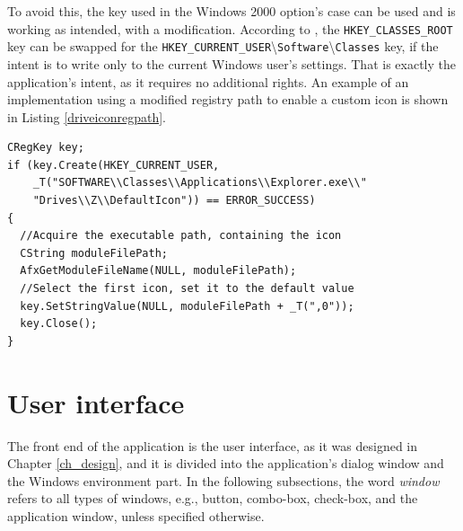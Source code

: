 To avoid this, the key used in the Windows 2000 option's case can be used and is working as intended, with a modification. According to \cite{WinHKCRKey}, the \lstinline{HKEY_CLASSES_ROOT} key can be swapped for the \lstinline{HKEY_CURRENT_USER}\textbackslash{}\lstinline{Software}\textbackslash{}\lstinline{Classes} key, if the intent is to write only to the current Windows user's settings. That is exactly the application's intent, as it requires no additional rights. An example of an implementation using a modified registry path to enable a custom icon is shown in Listing \ref{driveiconregpath}.
\begin{lstlisting}[caption={Implementing a custom drive icon for drive Z, using without administrator permissions.}, label=driveiconregpath]
CRegKey key;
if (key.Create(HKEY_CURRENT_USER,
    _T("SOFTWARE\\Classes\\Applications\\Explorer.exe\\"
    "Drives\\Z\\DefaultIcon")) == ERROR_SUCCESS)
{
  //Acquire the executable path, containing the icon
  CString moduleFilePath;
  AfxGetModuleFileName(NULL, moduleFilePath);
  //Select the first icon, set it to the default value
  key.SetStringValue(NULL, moduleFilePath + _T(",0")); 
  key.Close();
}
\end{lstlisting}

\section{User interface}
The front end of the application is the user interface, as it was designed in Chapter \ref{ch_design}, and it is divided into the application's dialog window and the Windows environment part. In the following subsections, the word \textit{window} refers to all types of windows, e.g., button, combo-box, check-box, and the application window, unless specified otherwise.


